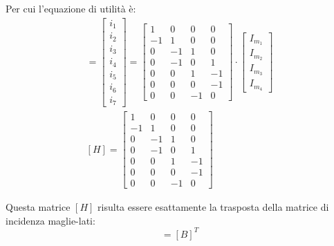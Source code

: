 \documentclass{article}
\numberwithin{equation}{subsection}
\begin{document}
Per cui l'equazione di utilità è: 
\begin{gather*}
    [i_l]=\begin{bmatrix}
        i_1\\
        i_2\\
        i_3\\
        i_4\\
        i_5\\
        i_6\\
        i_7
    \end{bmatrix}=\begin{bmatrix}
        1&0&0&0\\
        -1&1&0&0\\
        0&-1&1&0\\
        0&-1&0&1\\
        0&0&1&-1\\
        0&0&0&-1\\
        0&0&-1&0
    \end{bmatrix}\cdot\begin{bmatrix}
        I_{m_1}\\
        I_{m_2}\\
        I_{m_3}\\
        I_{m_4}
    \end{bmatrix}\\
    [H]=\begin{bmatrix}
        1&0&0&0\\
        -1&1&0&0\\
        0&-1&1&0\\
        0&-1&0&1\\
        0&0&1&-1\\
        0&0&0&-1\\
        0&0&-1&0
    \end{bmatrix}
\end{gather*}

Questa matrice $[H]$ risulta essere esattamente la trasposta della matrice di incidenza maglie-lati:
\begin{equation*}
    [H]=[B]^T
\end{equation*}
\end{document}
